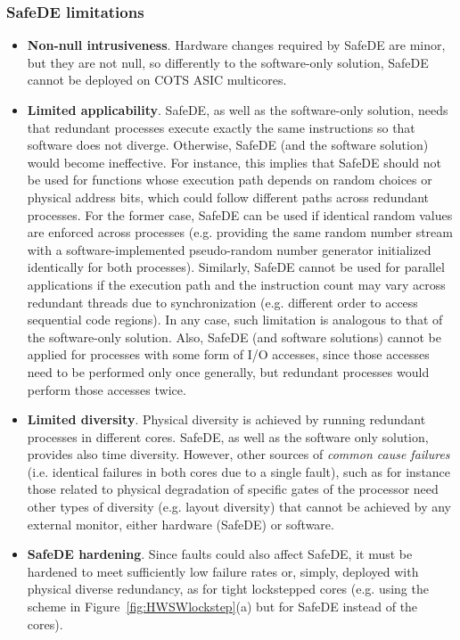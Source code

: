 \subsubsection{SafeDE limitations}
\begin{itemize}
\item \textbf{Non-null intrusiveness}. Hardware changes required by SafeDE are minor, but they are not null, so differently to the software-only solution, SafeDE cannot be deployed on COTS ASIC multicores.
\item \textbf{Limited applicability}. SafeDE, as well as the software-only solution, needs that redundant processes execute exactly the same instructions so that software does not diverge. Otherwise, SafeDE (and the software solution) would become ineffective. For instance, this implies that SafeDE should not be used for functions whose execution path depends on random choices or physical address bits, which could follow different paths across redundant processes. For the former case, SafeDE can be used if identical random values are enforced across processes (e.g. providing the same random number stream with a software-implemented pseudo-random number generator initialized identically for both processes). Similarly, SafeDE cannot be used for parallel applications if the execution path and the instruction count may vary across redundant threads due to synchronization (e.g. different order to access sequential code regions). In any case, such limitation is analogous to that of the software-only solution. Also, SafeDE (and software solutions) cannot be applied for processes with some form of I/O accesses, since those accesses need to be performed only once generally, but redundant processes would perform those accesses twice.
\item \textbf{Limited diversity}. Physical diversity is achieved by running redundant processes in different cores. SafeDE, as well as the software only solution, provides also time diversity. However, other sources of \emph{common cause failures} (i.e. identical failures in both cores due to a single fault), such as for instance those related to physical degradation of specific gates of the processor need other types of diversity (e.g. layout diversity) that cannot be achieved by any external monitor, either hardware (SafeDE) or software.
\item \textbf{SafeDE hardening}. Since faults could also affect SafeDE, it must be hardened to meet sufficiently low failure rates or, simply, deployed with physical diverse redundancy, as for tight lockstepped cores (e.g. using the scheme in Figure~\ref{fig:HWSWlockstep}(a) but for SafeDE instead of the cores). 
\end{itemize}


